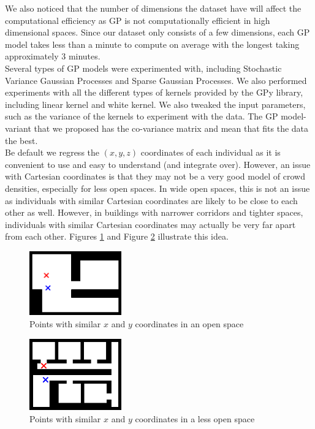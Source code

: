 \documentclass[letterpaper]{article}
\begin{document}
We also noticed that the number of dimensions the dataset have will affect the computational efficiency as GP is not computationally efficient in high dimensional spaces. Since our dataset only consists of a few dimensions, each GP model takes less than a minute to compute on average with the longest taking approximately 3 minutes.\\

Several types of GP models were experimented with, including Stochastic Variance Gaussian Processes and Sparse Gaussian Processes. We also performed experiments with all the different types of kernels provided by the GPy library, including linear kernel and white kernel. We also tweaked the input parameters, such as the variance of the kernels to experiment with the data. The GP model-variant that we proposed has the co-variance matrix and mean that fits the data the best. \\

Be default we regress the $(x,y,z)$ coordinates of each individual as it is convenient to use and easy to understand (and integrate over). However, an issue with Cartesian coordinates is that they may not be a very good model of crowd densities, especially for less open spaces. In wide open spaces, this is not an issue as individuals with similar Cartesian coordinates are likely to be close to each other as well. However, in buildings with narrower corridors and tighter spaces, individuals with similar Cartesian coordinates may actually be very far apart from each other. Figures \ref{fig:opspace1} and Figure \ref{fig:opspace2} illustrate this idea.

\begin{figure}[h!]
  \centering
    \includegraphics[width=150px,natwidth=634,natheight=442]{openspace1.png}
  \caption{Points with similar $x$ and $y$ coordinates in an open space}
  \label{fig:opspace1}
\end{figure}

\begin{figure}[h!]
  \centering
    \includegraphics[width=150px,natwidth=570,natheight=442]{openspace2.png}
  \caption{Points with similar $x$ and $y$ coordinates in a less open space}
  \label{fig:opspace2}
\end{figure}
\end{document}

